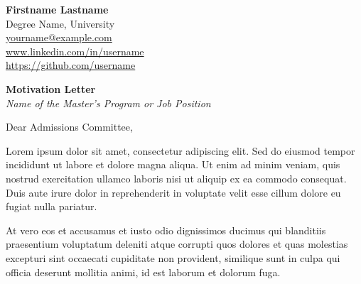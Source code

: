 \documentclass[11pt]{report}
\begin{document}
\begin{titlepage}

    \begin{minipage}[t]{0.95\textwidth}
        \hfill
        \raggedleft
        \textbf{Firstname Lastname}\\
        Degree Name, University \\
        \href{mailto:yourname@example.com}{yourname@example.com} \\
        \url{www.linkedin.com/in/username} \\
        \url{https://github.com/username}
    \end{minipage}

\vspace{1.0cm}

\raggedright \textbf{Motivation Letter} \\
\textit{Name of the Master's Program or Job Position} \\

\vspace{0.8em}

\raggedright Dear Admissions Committee,\\

\vspace{1.0em}

\justifying \noindent Lorem ipsum dolor sit amet, consectetur adipiscing elit. Sed do eiusmod tempor incididunt ut labore et dolore magna aliqua. Ut enim ad minim veniam, quis nostrud exercitation ullamco laboris nisi ut aliquip ex ea commodo consequat. Duis aute irure dolor in reprehenderit in voluptate velit esse cillum dolore eu fugiat nulla pariatur.

\vspace{1.0em}

\noindent At vero eos et accusamus et iusto odio dignissimos ducimus qui blanditiis praesentium voluptatum deleniti atque corrupti quos dolores et quas molestias excepturi sint occaecati cupiditate non provident, similique sunt in culpa qui officia deserunt mollitia animi, id est laborum et dolorum fuga.

\vspace{1.0em}


\end{titlepage}
\end{document}
